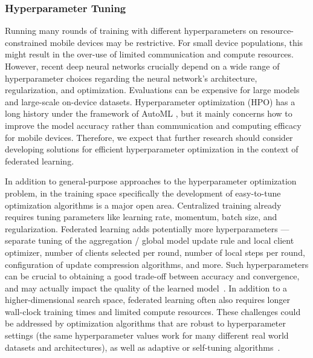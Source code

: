 \documentclass[11pt]{article}
\begin{document}
\subsubsection{Hyperparameter Tuning}
Running many rounds of training with different hyperparameters on resource-constrained mobile devices may be restrictive. For small device populations, this might result in the over-use of limited communication and compute resources. %
%
However, recent deep neural networks crucially depend on a wide range of hyperparameter choices regarding the neural network’s architecture, regularization, and optimization. Evaluations can be  expensive for large models and large-scale on-device datasets. Hyperparameter optimization (HPO) has a long history under the framework of AutoML \cite{ripley1993statistical,king1995statlog,kohavi1995automatic}, but it mainly concerns how to improve the model accuracy \cite{bergstra2011algorithms,snoek2015scalable,pedregosa2016hyperparameter,falkner2018bohb} rather than communication and computing efficacy for mobile devices. Therefore, we expect that further research should consider developing solutions for efficient hyperparameter optimization in the context of federated learning.

In addition to general-purpose approaches to the hyperparameter optimization problem, in the training space specifically the development of easy-to-tune optimization algorithms is a major open area. Centralized training already requires tuning parameters like learning rate, momentum, batch size, and regularization. Federated learning adds potentially more hyperparameters --- separate tuning of the aggregation / global model update rule and local client optimizer, number of clients selected per round, number of local steps per round, configuration of update compression algorithms, and more. Such hyperparameters can be crucial to obtaining a good trade-off between accuracy and convergence, and may actually impact the quality of the learned model~\citep{charles2020outsized}. In addition to a higher-dimensional search space, federated learning often also requires longer wall-clock training times and limited compute resources. These challenges could be addressed by optimization algorithms that are robust to hyperparameter settings (the same hyperparameter values work for many different real world datasets and architectures), as well as adaptive or self-tuning algorithms~\cite{thakkar2019differentially,bonawitz2019autotune}.
\end{document}
